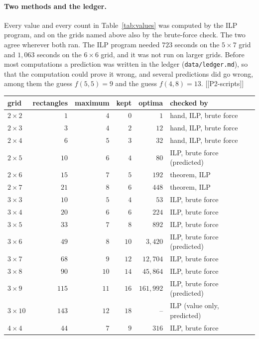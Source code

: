 \paragraph{Two methods and the ledger.} Every value and every count in
Table~\ref{tab:values} was computed by the ILP program, and on the grids named above also by
the brute-force check. The two agree wherever both ran. The ILP program
needed $723$ seconds on the $5\times7$ grid and $1{,}063$ seconds on the $6\times6$ grid, and
it was not run on larger grids. Before most computations a prediction was written in the
ledger (\texttt{data/ledger.md}), so that the computation could prove it wrong, and several
predictions did go wrong, among them the guess $f(5,5)=9$ and the guess $f(4,8)=13$.
[[P2-scripts]]

\begin{table}[t]
\centering\small
\begin{tabular}{@{}lrrrrl@{}}
\toprule
grid & rectangles & maximum & kept & optima & checked by \\
\midrule
$2\times2$ & $1$ & $4$ & $0$ & $1$ & hand, ILP, brute force \\
$2\times3$ & $3$ & $4$ & $2$ & $12$ & hand, ILP, brute force \\
$2\times4$ & $6$ & $5$ & $3$ & $32$ & hand, ILP, brute force \\
$2\times5$ & $10$ & $6$ & $4$ & $80$ & ILP, brute force (predicted) \\
$2\times6$ & $15$ & $7$ & $5$ & $192$ & theorem, ILP \\
$2\times7$ & $21$ & $8$ & $6$ & $448$ & theorem, ILP \\
$3\times3$ & $10$ & $5$ & $4$ & $53$ & ILP, brute force \\
$3\times4$ & $20$ & $6$ & $6$ & $224$ & ILP, brute force \\
$3\times5$ & $33$ & $7$ & $8$ & $892$ & ILP, brute force \\
$3\times6$ & $49$ & $8$ & $10$ & $3{,}420$ & ILP, brute force (predicted) \\
$3\times7$ & $68$ & $9$ & $12$ & $12{,}704$ & ILP, brute force \\
$3\times8$ & $90$ & $10$ & $14$ & $45{,}864$ & ILP, brute force \\
$3\times9$ & $115$ & $11$ & $16$ & $161{,}992$ & ILP, brute force (predicted) \\
$3\times10$ & $143$ & $12$ & $18$ & -- & ILP (value only, predicted) \\
$4\times4$ & $44$ & $7$ & $9$ & $316$ & ILP, brute force \\

\end{tabular}
\end{table}
